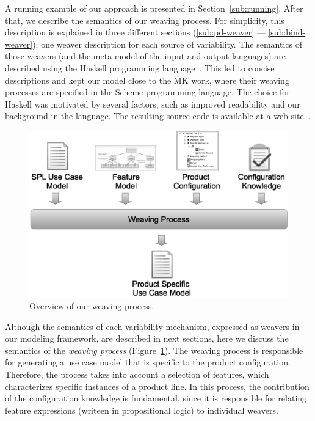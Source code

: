 \documentclass{acm_proc_article-sp}
\begin{document}
A running example of our approach is presented in Section~\ref{sub:running}.
After that, we describe the semantics of our weaving process. For simplicity,
this description is explained in three different sections (\ref{sub:pd-weaver}
--- \ref{sub:bind-weaver}); one weaver description for each source of
variability. The semantics of those weavers (and the meta-model of the input and
output languages) are described using the Haskell programming
language~\cite{Jones:2002aa}. This led to concise descriptions and kept our model
close to the MK work, where their weaving processes are specified in the Scheme
programming language. The choice for Haskell was motivated by several factors,
such as improved readability and our background in the language. The resulting
source code is available at a web site~\cite{spg-url}.
 
\begin{figure}[h]
 \begin{center}
  \includegraphics[scale=0.30]{img/weave-process2.eps}
  \caption{Overview of our weaving process.}
  \label{fig:weave-process}
  \end{center}
\end{figure}

Although the semantics of each variability mechanism, expressed as weavers in
our modeling framework, are described in next sections, here we discuss the
semantics of the \emph{weaving process} (Figure~\ref{fig:weave-process}). The
weaving process is responsible for generating a use case model that is specific to the 
product configuration. Therefore, the process takes into account a selection of
features, which characterizes specific instances of a product line. In this
process, the contribution of the configuration knowledge is fundamental, since
it is responsible for relating feature expressions (writeen in propositional
logic) to individual weavers. 
\end{document}
